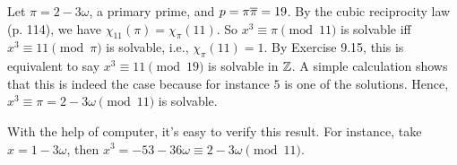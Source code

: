 \documentclass[../I&R.tex]{subfiles}
\begin{document}
Let $\pi=2-3\omega$, a primary prime, and $p=\pi\overline{\pi}=19$. By the cubic reciprocity law (p. 114), we have $\chi_{11}(\pi)=\chi_\pi(11)$. So $x^3\equiv\pi\pmod{11}$ is solvable iff $x^3\equiv11\pmod{\pi}$ is solvable, i.e., $\chi_\pi(11)=1$. By Exercise 9.15, this is equivalent to say $x^3\equiv11\pmod{19}$ is solvable in $\mathbb{Z}$. A simple calculation shows that this is indeed the case because for instance $5$ is one of the solutions. Hence, $x^3\equiv\pi=2-3\omega\pmod{11}$ is solvable.

With the help of computer, it's easy to verify this result. For instance, take $x=1-3\omega$, then $x^3=-53-36\omega\equiv2-3\omega\pmod{11}$.

\begin{comment}

\subsection*{Exercise 9.17}

By Exercise 9.2, we may write $\gamma=\pm\omega^b\lambda^c\gamma_1\cdots\gamma_t$ where $\gamma_i$ is a primary prime for all $i$. So $2\equiv\gamma\equiv\pm\omega^b\lambda^c2^t\pmod{3}$. This implies $\omega^b\lambda^c\equiv1,2\pmod{3}$. Note that since $\lambda^2=-3\omega\equiv0\pmod{3}$, we have $c=0,1$. So we only need to check six cases, namely, $(b,c)=(0,0),(1,0),(2,0),(0,1),(1,1),(2,1)$. These correspond to $\omega^b\lambda^c=1,\omega,\omega^2,\lambda,\omega\lambda,\omega^2\lambda$, respectively.

Since $a+b\omega\equiv1,2\pmod{3}$ is equivalent to $a\equiv1,2\pmod{3}$ and $b\equiv0\pmod{3}$, it's easy to check that the only possible case is $(b,c)=(0,0)$. This implies $\gamma=\pm\gamma_1\cdots\gamma_t$ and so we are done.

\subsection*{Exercise 9.18}

Note that if $\alpha\equiv\beta\pmod{\gamma}$, then $\alpha\equiv\beta\pmod{\gamma_i}$ for all $i=1,\ldots,t$. So $\chi_\gamma(\alpha) \overset{\df}{=} \prod_{i=1}^t \chi_{\gamma_i}(\alpha) = \prod_{i=1}^t \chi_{\gamma_i}(\beta) \overset{\df}{=} \chi_\gamma(\beta)$. Also, $\chi_\gamma(\alpha\beta) \overset{\df}{=} \prod_{i=1}^t \chi_{\gamma_i}(\alpha\beta) = \prod_{i=1}^t \chi_{\gamma_i}(\alpha)\chi_{\gamma_i}(\beta) = \prod_{i=1}^t \chi_{\gamma_i}(\alpha)\prod_{i=1}^t \chi_{\gamma_i}(\beta) \overset{\df}{=} \chi_\gamma(\alpha)\chi_\gamma(\beta)$.

If $\rho=\pm\rho_1\cdots\rho_s$ is a primary decomposition of $\rho$, then $-\rho\gamma=\pm(\rho_1\cdots\rho_s\gamma_1\cdots\gamma_t)$ is a primary decomposition of $-\rho\gamma$. So $\chi_\rho(\alpha)\chi_\gamma(\alpha) \overset{\df}{=} \prod_{j=1}^s \chi_{\rho_j}(\alpha)\prod_{i=1}^t \chi_{\gamma_i}(\alpha) \overset{\df}{=} \chi_{-\rho\gamma}(\alpha)$.

\end{comment}
\end{document}
